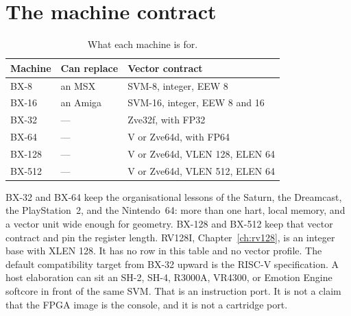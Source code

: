 \section{The machine contract}

\begin{table}[htbp]
\centering
\caption{What each machine is for.}
\begin{tabular}{@{}llp{6.2cm}@{}}
\toprule
Machine & Can replace & Vector contract \\
\midrule
BX-8  & an MSX   & SVM-8, integer, EEW 8 \\
BX-16 & an Amiga & SVM-16, integer, EEW 8 and 16 \\
BX-32 & ---      & Zve32f, with FP32 \\
BX-64 & ---      & V or Zve64d, with FP64 \\
BX-128 & ---     & V or Zve64d, VLEN 128, ELEN 64 \\
BX-512 & ---     & V or Zve64d, VLEN 512, ELEN 64 \\
\bottomrule
\end{tabular}
\end{table}

BX-32 and BX-64 keep the organisational lessons of the Saturn, the Dreamcast, the PlayStation~2, and the Nintendo~64: more than one hart, local memory, and a vector unit wide enough for geometry. BX-128 and BX-512 keep that vector contract and pin the register length. RV128I, Chapter~\ref{ch:rv128}, is an integer base with XLEN 128. It has no row in this table and no vector profile. The default compatibility target from BX-32 upward is the RISC-V specification. A host elaboration can sit an SH-2, SH-4, R3000A, VR4300, or Emotion Engine softcore in front of the same SVM. That is an instruction port. It is not a claim that the FPGA image is the console, and it is not a cartridge port.
